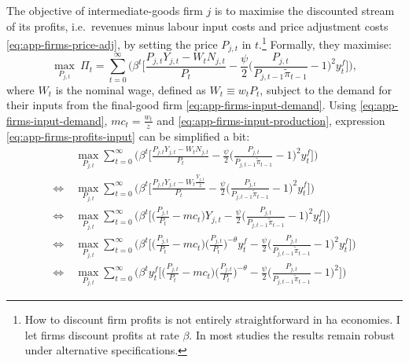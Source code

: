 \documentclass[a4paper,12pt]{article} %
\numberwithin{equation}{section} %
\numberwithin{figure}{section}
\numberwithin{table}{section}
\begin{document}
\begin{refsection}
\begin{appendices}
The objective of intermediate-goods firm $j$ is to maximise the discounted stream of its profits, i.e.~revenues minus labour input costs and price adjustment costs \eqref{eq:app-firms-price-adj}, by setting the price $P_{j,t}$ in $t$.\footnote{How to discount firm profits is not entirely straightforward in \Gls{ha} economies. I let firms discount profits at rate $\beta$. In most studies the results remain robust under alternative specifications.} Formally, they maximise:
\begin{equation}
    \max_{P_{j,t}} \ \Pi_t = \sum_{t=0}^{\infty} \Bigg( \beta^t \Bigg[ \frac{P_{j,t} Y_{j,t} - W_t N_{j,t}}{P_t} - \frac{\psi}{2} \Bigg( \frac{P_{j,t}}{P_{j,t-1} \tilde{\pi}_{t-1}} - 1 \Bigg)^2 y_t^f \Bigg] \Bigg), \label{eq:app-firms-profits-input}
\end{equation}
where $W_t$ is the nominal wage, defined as $W_t \equiv w_t P_t$, subject to the demand for their inputs from the final-good firm \eqref{eq:app-firms-input-demand}. Using \eqref{eq:app-firms-input-demand}, $mc_t = \frac{w_t}{z}$ and \eqref{eq:app-firms-input-production}, expression \eqref{eq:app-firms-profits-input} can be simplified a bit:
\begin{align}
    &\max_{P_{j,t}} \sum_{t=0}^{\infty} \Bigg( \beta^t \Bigg[ \frac{P_{j,t} Y_{j,t} - W_t N_{j,t}}{P_t} - \frac{\psi}{2} \Bigg( \frac{P_{j,t}}{P_{j,t-1} \tilde{\pi}_{t-1}} - 1 \Bigg)^2 y_t^f \Bigg] \Bigg) \nonumber \\
    \Leftrightarrow \ &\max_{P_{j,t}} \sum_{t=0}^{\infty} \Bigg( \beta^t \Bigg[ \frac{P_{j,t} Y_{j,t} - W_t \frac{Y_{j,t}}{z}}{P_t} - \frac{\psi}{2} \Bigg( \frac{P_{j,t}}{P_{j,t-1} \tilde{\pi}_{t-1}} - 1 \Bigg)^2 y_t^f \Bigg] \Bigg) \nonumber \\
    \Leftrightarrow \ &\max_{P_{j,t}} \sum_{t=0}^{\infty} \Bigg( \beta^t \Bigg[ \Bigg( \frac{P_{j,t}}{P_t} - mc_t \Bigg) Y_{j,t} - \frac{\psi}{2} \Bigg( \frac{P_{j,t}}{P_{j,t-1} \tilde{\pi}_{t-1}} - 1 \Bigg)^2 y_t^f \Bigg] \Bigg) \nonumber \\
    \Leftrightarrow \ &\max_{P_{j,t}} \sum_{t=0}^{\infty} \Bigg( \beta^t \Bigg[ \Bigg( \frac{P_{j,t}}{P_t} - mc_t \Bigg) \Bigg( \frac{P_{j,t}}{P_t} \Bigg)^{-\theta} y_t^f - \frac{\psi}{2} \Bigg( \frac{P_{j,t}}{P_{j,t-1} \tilde{\pi}_{t-1}} - 1 \Bigg)^2 y_t^f \Bigg] \Bigg) \nonumber \\
    \Leftrightarrow \ &\max_{P_{j,t}} \sum_{t=0}^{\infty} \Bigg( \beta^t y_t^f \Bigg[ \Bigg( \frac{P_{j,t}}{P_t} - mc_t \Bigg) \Bigg( \frac{P_{j,t}}{P_t} \Bigg)^{-\theta} - \frac{\psi}{2} \Bigg( \frac{P_{j,t}}{P_{j,t-1} \tilde{\pi}_{t-1}} - 1 \Bigg)^2 \Bigg] \Bigg) \label{eq:app-firms-input-max}
\end{align}


\end{appendices}
\end{refsection}
\end{document}
